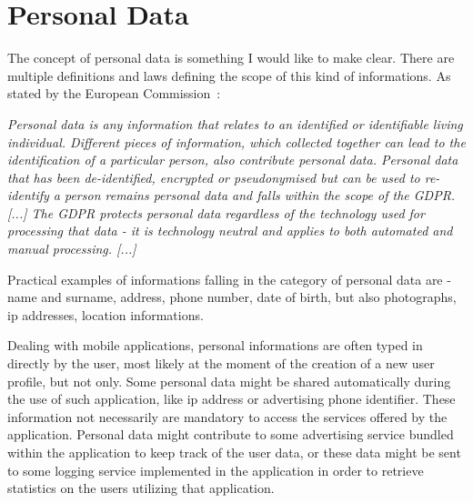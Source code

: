 	\section{Personal Data}
		\par The concept of personal data is something I would like to make clear. There are multiple definitions and laws defining the scope of this kind of informations. As stated by the European Commission~\cite{European Commission}:
		\begin{framed}
			\textit{
				Personal data is any information that relates to an identified or identifiable living individual. Different pieces of information, which collected together can lead to the identification of a particular person, also contribute personal data. \newline
				\indent Personal data that has been de-identified, encrypted or pseudonymised but can be used to re-identify a person remains personal data and falls within the scope of the GDPR. [...] \newline
				\indent The GDPR protects personal data regardless of the technology used for processing that data - it is technology neutral and applies to both automated and manual processing. [...]
			}
		\end{framed}
		\par Practical examples of informations falling in the category of personal data are - name and surname, address, phone number, date of birth, but also photographs, ip addresses, location informations. \newline
		\par Dealing with mobile applications, personal informations are often typed in directly by the user, most likely at the moment of the creation of a new user profile, but not only. Some personal data might be shared automatically during the use of such application, like ip address or advertising phone identifier. \newline
		These information not necessarily are mandatory to access the services offered by the application. Personal data might contribute to some advertising service bundled within the application to keep track of the user data, or these data might be sent to some logging service implemented in the application in order to retrieve statistics on the users utilizing that application. 
	
